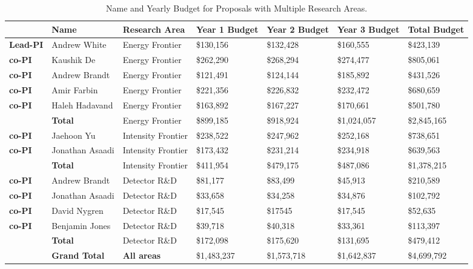 \begin{table}[htb]
\centering
\begin{tabular}{ || l || l |  p{1.7cm} | p{1.7cm} | p{1.7cm} || p{1.7cm} | p{1.8cm} || }
\hline\hline\hline
 & \textbf{Name} & \textbf{Research Area} & \textbf{Year 1 Budget} & \textbf{Year 2 Budget} & \textbf{Year 3 Budget} & \textbf{Total Budget} \\ \hline\hline
\textbf{Lead-PI} & Andrew White & Energy Frontier & \$130,156 & \$132,428 & \$160,555 & \$423,139 \\ \hline
\textbf{co-PI} & Kaushik De & Energy Frontier & \$262,290 & \$268,294 & \$274,477 & \$805,061  \\ \hline
\textbf{co-PI} & Andrew Brandt & Energy Frontier & \$121,491 & \$124,144 & \$185,892 & \$431,526 \\ \hline
\textbf{co-PI} & Amir Farbin & Energy Frontier & \$221,356 & \$226,832 & \$232,472 & \$680,659 \\ \hline
\textbf{co-PI} & Haleh Hadavand & Energy Frontier & \$163,892 & \$167,227 & \$170,661 & \$501,780 \\ \hline\hline
 & \textbf{Total} & Energy Frontier & \$899,185 & \$918,924 & \$1,024,057 & \$2,845,165 \\ \hline\hline
\textbf{co-PI} & Jaehoon Yu & Intensity Frontier & \$238,522 & \$247,962 & \$252,168 & \$738,651 \\ \hline
\textbf{co-PI} & Jonathan Asaadi & Intensity Frontier & \$173,432 & \$231,214 & \$234,918 & \$639,563 \\ \hline\hline
 & \textbf{Total} & Intensity Frontier & \$411,954 & \$479,175 & \$487,086 & \$1,378,215 \\ \hline\hline
\textbf{co-PI} & Andrew Brandt & Detector R\&D & \$81,177 & \$83,499 & \$45,913 & \$210,589 \\ \hline\hline
\textbf{co-PI} & Jonathan Asaadi & Detector R\&D & \$33,658 & \$34,258 & \$34,876 & \$102,792 \\ \hline\hline
\textbf{co-PI} & David Nygren & Detector R\&D & \$17,545 & \$17545 & \$17,545 & \$52,635 \\ \hline\hline
\textbf{co-PI} & Benjamin Jones & Detector R\&D & \$39,718 & \$40,318 & \$33,361 & \$113,397 \\ \hline\hline
 & \textbf{Total} & Detector R\&D & \$172,098 & \$175,620 & \$131,695 & \$479,412 \\ \hline\hline\hline
 & \textbf{Grand Total} & \textbf{All areas} & \$1,483,237 & \$1,573,718 & \$1,642,837 & \$4,699,792 \\ \hline\hline\hline
\end{tabular}
\caption{Name and Yearly Budget for Proposals with Multiple Research Areas.}
\end{table}
